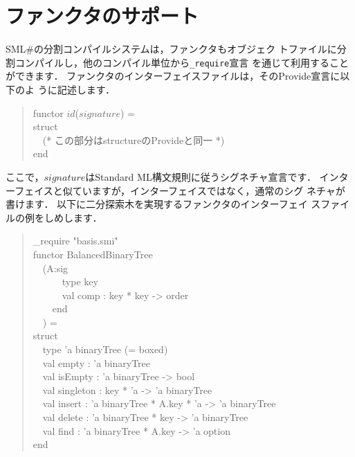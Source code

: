 \documentclass{jbook}
\newif\ifjp
\newcommand{\txt}[2]{#1}
\newcommand{\smlsharp}{SML\#}
\newcommand{\myem}{\mbox{\ \ }}
\newenvironment{program}{\begin{quote}\begin{tt}}%
                        {\end{tt}\end{quote}}
\begin{document}
\section{\txt{ファンクタのサポート}{Functor support}}
\label{sec:tutorialFunctorInInterface}

\ifjp%
	\smlsharp{}の分割コンパイルシステムは，ファンクタもオブジェク
トファイルに分割コンパイルし，他のコンパイル単位から{\tt \_require}宣言
を通じて利用することができます．
	ファンクタのインターフェイスファイルは，そのProvide宣言に以下のよ
うに記述します．
\begin{program}
functor $id$($signature$) =\\
struct\\
\myem (* この部分はstructureのProvideと同一 *)\\
end
\end{program}
	ここで，$signature$はStandard ML構文規則に従うシグネチャ宣言です．
	インターフェイスと似ていますが，インターフェイスではなく，通常のシグ
ネチャが書けます．
	以下に二分探索木を実現するファンクタのインターフェイ
スファイルの例をしめします．
\begin{program}
\_require "basis.smi"\\
functor BalancedBinaryTree\\
\myem  (A:sig\\
\myem\myem\myem      type key\\
\myem\myem\myem      val comp : key * key -> order\\
\myem\myem    end\\
\myem  ) =\\
struct\\
\myem type 'a binaryTree (= boxed)\\
\myem  val empty : 'a binaryTree\\
\myem  val isEmpty : 'a binaryTree -> bool\\
\myem  val singleton : key * 'a -> 'a binaryTree\\
\myem  val insert : 'a binaryTree * A.key * 'a -> 'a binaryTree\\
\myem  val delete : 'a binaryTree * key -> 'a binaryTree\\
\myem  val find : 'a binaryTree * A.key -> 'a option\\
end
\end{program}
\end{document}
